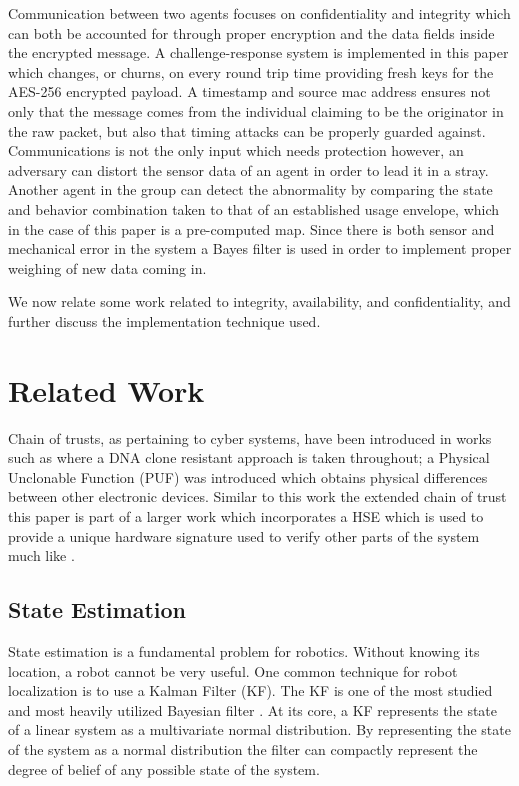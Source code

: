 \documentclass[conference]{IEEEtran}
\begin{document}
Communication between two agents focuses on confidentiality and integrity which can both be accounted for through proper encryption and the data fields inside the encrypted message. A challenge-response system is implemented in this paper which changes, or churns, on every round trip time providing fresh keys for the AES-256 encrypted payload. A timestamp and source mac address ensures not only that the message comes from the individual claiming to be the originator in the raw packet, but also that timing attacks can be properly guarded against. Communications is not the only input which needs protection however, an adversary can distort the sensor data of an agent in order to lead it in a stray. Another agent in the group can detect the abnormality by comparing the state and behavior combination taken to that of an established usage envelope, which in the case of this paper is a pre-computed map. Since there is both sensor and mechanical error in the system a Bayes filter is used in order to implement proper weighing of new data coming in. 

We now relate some work related to integrity, availability, and confidentiality, and further discuss the implementation technique used. 

\section{Related Work}
Chain of trusts, as pertaining to cyber systems, have been introduced in works such as \cite{adi2009mechatronic} where a DNA clone resistant approach is taken throughout; a Physical Unclonable Function (PUF) was introduced which obtains physical differences between other electronic devices. Similar to this work the extended chain of trust this paper is part of a larger work which incorporates a HSE which is used to provide a unique hardware signature used to verify other parts of the system much like \cite{adi2009mechatronic}.

\subsection{State Estimation}
State estimation is a fundamental problem for robotics. Without knowing its location, a robot cannot be very useful. One common technique for robot localization is to use a Kalman Filter (KF). The KF is one of the most studied and most heavily utilized Bayesian filter \cite[39-81]{ProbabilisticRobotics}. At its core, a KF represents the state of a linear system as a multivariate normal distribution. By representing the state of the system as a normal distribution the filter can compactly represent the degree of belief of any possible state of the system.
\end{document}

